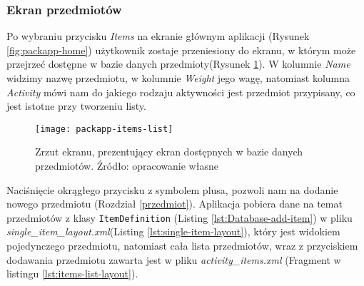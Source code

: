 \documentclass[a4paper,12pt]{article}
\begin{document}
\subsubsection{Ekran przedmiotów}

Po wybraniu przycisku \textit{Items} na ekranie głównym aplikacji (Rysunek \ref{fig:packapp-home}) użytkownik zostaje przeniesiony do ekranu, w którym może przejrzeć dostępne w bazie danych przedmioty(Rysunek \ref{fig:packapp-items-list}). W kolumnie \textit{Name} widzimy nazwę przedmiotu, w kolumnie \textit{Weight} jego wagę, natomiast kolumna \textit{Activity} mówi nam do jakiego rodzaju aktywności jest przedmiot przypisany, co jest istotne przy tworzeniu listy.

\begin{figure}[H]
    \centering
    \texttt{[image: packapp-items-list]}
    \caption{Zrzut ekranu, prezentujący ekran dostępnych w bazie danych przedmiotów. Źródło: opracowanie własne}
    \label{fig:packapp-items-list}
\end{figure}

Naciśnięcie okrągłego przycisku z symbolem plusa, pozwoli nam na dodanie nowego przedmiotu (Rozdział \ref{przedmiot}). Aplikacja pobiera dane na temat przedmiotów z klasy \texttt{ItemDefinition} (Listing \ref{lst:Database-add-item}) w pliku \textit{single\_item\_layout.xml}(Listing \ref{lst:single-item-layout}), który jest widokiem pojedynczego przedmiotu, natomiast cała lista przedmiotów, wraz z przyciskiem dodawania przedmiotu zawarta jest w pliku \textit{activity\_items.xml} (Fragment w listingu \ref{lst:items-list-layout}).
\end{document}
